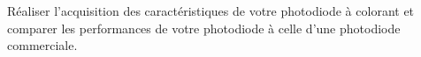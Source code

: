 \documentclass[twoside,a4paper,11pt,addpoints,answers]{exam}%
\newcounter{foo} %
\begin{document}
Réaliser l'acquisition des caractéristiques de votre photodiode à colorant et comparer les performances de votre photodiode à celle d'une photodiode commerciale.

\end{document}
